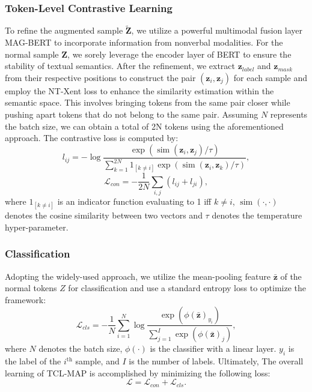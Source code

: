 \documentclass[letterpaper]{article} %
\begin{document}
\subsubsection{Token-Level Contrastive Learning}
To refine the augmented sample $\widetilde{\textbf{Z}}$, we utilize a powerful multimodal fusion layer MAG-BERT \cite{rahman2020integrating} to incorporate information from nonverbal modalities. For the normal sample $\textbf{Z}$, we sorely leverage the encoder layer of BERT \cite{devlin2018bert} to ensure the stability of textual semantics. After the refinement, we extract $\textbf{z}_{label}$ and $\textbf{z}_{mask}$ from their respective positions to construct the pair $(\textbf{z}_{i}, \textbf{z}_{j})$ for each sample and employ the NT-Xent \cite{sohn2016improved} loss to enhance the similarity estimation within the semantic space. This involves bringing tokens from the same pair closer while pushing apart tokens that do not belong to the same pair. Assuming $N$ represents the batch size, we can obtain a total of 2N tokens using the aforementioned approach. The contrastive loss is computed by:
\begin{equation}
    l_{ij}=-\log \frac{\exp \left(\operatorname{sim}\left(\textbf{z}_i, \textbf{z}_j\right) / \tau\right)}{\sum_{k=1}^{2 N} 1_{[k \neq i]} \exp \left(\operatorname{sim}\left(\textbf{z}_i, \textbf{z}_k\right) / \tau\right)},
\end{equation}
\begin{equation}
    \mathcal{L}_{con} = -\frac{1}{2N}\sum_{i,j}(l_{ij}+l_{ji}),
\end{equation}
where $1_{[k \neq i]}$ is an indicator function evaluating to 1 iff $k \neq i$, $\operatorname{sim}(\cdot, \cdot)$ denotes the cosine similarity between two vectors and $\tau$ denotes the temperature hyper-parameter.
\subsubsection{Classification}
Adopting the widely-used approach, we utilize the mean-pooling feature $\bar{\textbf{z}}$ of the normal tokens $Z$ for classification and use a standard entropy loss to optimize the framework:
\begin{equation}
    \mathcal{L}_{cls}=-\frac{1}{N}\sum_{i=1}^{N} \log\frac{\exp(\phi(\bar{\textbf{z}})_{y_{i}})}{\sum_{j=1}^{I}\exp(\phi(\bar{\textbf{z}})_{j})},
\end{equation}
where $N$ denotes the batch size, $\phi(\cdot)$ is the classifier with a linear layer. $y_{i}$ is the label of the $i^{\text{th}}$ sample, and $I$ is the number of labels. Ultimately, The overall learning of TCL-MAP is accomplished by minimizing the following loss:
\begin{equation}
    \mathcal{L} = \mathcal{L}_{con} + \mathcal{L}_{cls}.
\end{equation}
\end{document}
